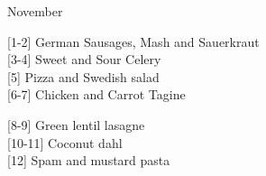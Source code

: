 		\begin{menu}{November}
    
    \begin{recipelist}
    
        {\scriptsize[1-2]} German Sausages, Mash and Sauerkraut\\
        {\scriptsize[3-4]} Sweet and Sour Celery\\
        {\scriptsize[5]} Pizza and Swedish salad\\
        {\scriptsize[6-7]} Chicken and Carrot Tagine\\%
    \end{recipelist}%
    \begin{recipelist}
    
        {\scriptsize[8-9]} Green lentil lasagne\\
        {\scriptsize[10-11]} Coconut dahl\\
        {\scriptsize[12]} Spam and mustard pasta\\
    \end{recipelist}\par%
  

\end{menu}
